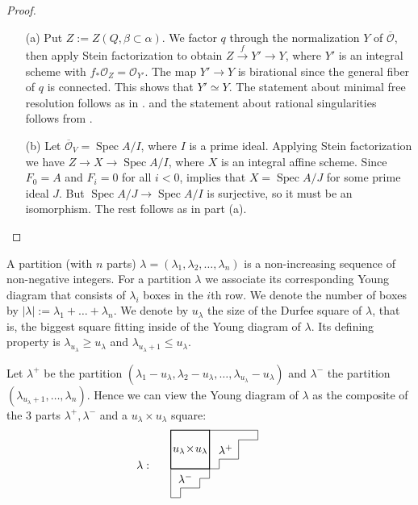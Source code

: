 \documentclass[twoside]{article}
\newcommand{\orb}{\mathcal{O}}
\newcommand{\op}{\operatorname}
\theoremstyle{definition}
\begin{document}
\begin{proof}
\begin{itemize}
\item[(a)] Put $Z:= Z(Q,\beta\subset \alpha)$.  We factor $q$ through the normalization $Y$ of $\overline{\orb}$, then apply Stein factorization to obtain $Z\xrightarrow{f} Y'\to Y$, where $Y'$ is an integral scheme with $f_* \mathcal{O}_Z = \mathcal{O}_{Y'}$. The map $Y'\to Y$ is birational since the general fiber of $q$ is connected. This shows that $Y'\simeq Y$. The statement about minimal free resolution follows as in \cite[Theorem 5.1.3]{jerzy}. and the statement about rational singularities follows from \cite{kovacs}.
\item[(b)] Let $\overline{\orb}_V= \op{Spec} A/I$, where $I$ is a prime ideal. Applying Stein factorization we have $Z\to X \to \op{Spec} A/I$, where $X$ is an integral affine scheme. Since $F_0=A$ and  $F_i=0$ for all $i<0$,  \cite[Theorem 5.1.3]{jerzy} implies that $X=\op{Spec} A/J$ for some prime ideal $J$. But $\op{Spec} A/J \to \op{Spec} A/I$ is surjective, so it must be an isomorphism. The rest follows as in part (a).
\end{itemize}
\end{proof}

A partition (with $n$ parts) $\lambda = (\lambda_1,\lambda_2,\dots,\lambda_n)$ is a non-increasing sequence of non-negative integers. For a partition $\lambda$ we associate its corresponding Young diagram that consists of $\lambda_i$ boxes in the $i$th row. We denote the number of boxes by $|\lambda|:= \lambda_1+\dots+\lambda_n$. We denote by $u_\lambda$ the size of the Durfee square of $\lambda$, that is, the biggest square fitting inside of the Young diagram of $\lambda$. Its defining property is $\lambda_{u_\lambda}\geq u_\lambda$ and $\lambda_{u_\lambda+1}\leq u_\lambda$.

Let $\lambda^+$ be the partition $(\lambda_1-u_{\lambda},\lambda_2-u_{\lambda},\dots,\lambda_{u_\lambda}-u_{\lambda})$ and $\lambda^{-}$ the partition $(\lambda_{u_\lambda+1},\dots,\lambda_n)$. Hence we can view the Young diagram of $\lambda$ as the composite of the $3$ parts $\lambda^+,\lambda^{-}$ and a $u_\lambda\times u_\lambda$ square:
\[ \hspace{-0.3in} \lambda: \hspace{0.2in}
\begin{aligned}
\begin{tikzpicture}
\draw (0,0.9)--(0,0)--(0.3,0)--(0.3,0.3)--(0.9,0.3)--(0.9,0.6)--(1.2,0.6)--(1.2,0.9);
\node at (0.45,0.6) {$\lambda^-$};
\draw [thick] (0,0.9)--(0,2.1)--(1.2,2.1)--(1.2,0.9)--(0,0.9);
\node at (0.6,1.5) {$u_\lambda \! \times \! u_\lambda$};
\draw(1.2,0.9)--(1.5,0.9)--(1.5,1.2)--(2.1,1.2)--(2.1,1.8)--(2.7,1.8)--(2.7,2.1)--(1.2,2.1);
\node at (1.7,1.5) {$\lambda^+$};
\end{tikzpicture}
\end{aligned}
\]
\end{document}
